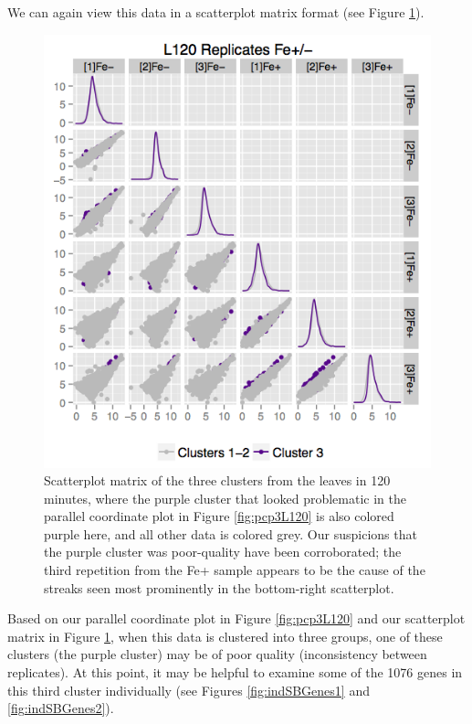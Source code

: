\documentclass[11pt,a4paper,oldfontcommands,openany]{memoir}
\numberwithin{equation}{section} %
\begin{document}
We can again view this data in a scatterplot matrix format (see Figure \ref{fig:3scatterL120}).

\begin{figure}[H]
  \begin{framed}
  \centering
  \includegraphics[width=\textwidth]{3scatterL120}
  \end{framed}
  \caption{Scatterplot matrix of the three clusters from the leaves in 120 minutes, where the purple cluster that looked problematic in the parallel coordinate plot in Figure \ref{fig:pcp3L120} is also colored purple here, and all other data is colored grey. Our suspicions that the purple cluster was poor-quality have been corroborated; the third repetition from the Fe+ sample appears to be the cause of the streaks seen most prominently in the bottom-right scatterplot.}
  \label{fig:3scatterL120}
\end{figure}

\vspace{-1cm}

Based on our parallel coordinate plot in Figure \ref{fig:pcp3L120} and our scatterplot matrix in Figure \ref{fig:3scatterL120}, when this data is clustered into three groups, one of these clusters (the purple cluster) may be of poor quality (inconsistency between replicates). At this point, it may be helpful to examine some of the 1076 genes in this third cluster individually (see Figures \ref{fig:indSBGenes1} and \ref{fig:indSBGenes2}).
\end{document}
